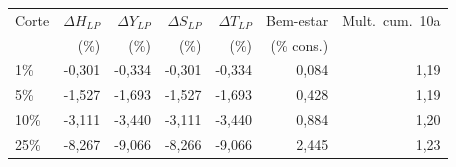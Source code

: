 \begin{tabular}{lrrrrrr}
\toprule
Corte & $\Delta H_{LP}$ & $\Delta Y_{LP}$ & $\Delta S_{LP}$ & $\Delta T_{LP}$ & Bem-estar & Mult.\ cum.\ 10a \\
 & (\%) & (\%) & (\%) & (\%) & (\% cons.) & \\
\midrule
1\% & -0,301 & -0,334 & -0,301 & -0,334 & 0,084 & 1,19 \\
5\% & -1,527 & -1,693 & -1,527 & -1,693 & 0,428 & 1,19 \\
10\% & -3,111 & -3,440 & -3,111 & -3,440 & 0,884 & 1,20 \\
25\% & -8,267 & -9,066 & -8,266 & -9,066 & 2,445 & 1,23 \\
\bottomrule
\end{tabular}
